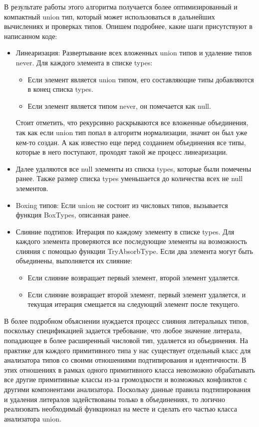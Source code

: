В результате работы этого алгоритма получается более оптимизированный и компактный union тип, который может
использоваться в дальнейших вычислениях и проверках типов.
Опишем подробнее, какие шаги присутствуют в написанном коде:

\begin{itemize}[left=2em]
    \item Линеаризация: Развертывание всех вложенных union типов и удаление типов never.
    Для каждого элемента в списке types:
    \begin{itemize}[left=2em]
        \item Если элемент является union типом, его составляющие типы добавляются в конец списка types.
        \item Если элемент является типом never, он помечается как null.
    \end{itemize}
    Стоит отметить, что рекурсивно раскрываются все вложенные объединения, так как если union тип попал в алгоритм
    нормализации, значит он был уже кем-то создан.
    А как известно еще перед созданием объединения все типы, которые в него поступают, проходят такой же процесс линеаризации.

    \item Далее удаляются все null элементы из списка types, которые были помечены ранее.
    Также размер списка types уменьшается до количества всех не null элементов.
    \item Boxing типов: Если union не состоит из числовых типов, вызывается функция BoxTypes, описанная ранее.
    \item Слияние подтипов: Итерация по каждому элементу в списке types.
    Для каждого элемента проверяются все последующие элементы на возможность слияния с помощью функции TryAbsorbType.
    Если два элемента могут быть объединены, выполняется их слияние:
    \begin{itemize}[left=2em]
        \item Если слияние возвращает первый элемент, второй элемент удаляется.
        \item Если слияние возвращает второй элемент, первый элемент удаляется, и текущая итерация смещается на
        следующий элемент после текущего.
    \end{itemize}
\end{itemize}

В более подробном объяснении нуждается процесс слияния литеральных типов, поскольку спецификацией задается требование,
что любое значение литерала, попадающее в более расширенный числовой тип, удаляется из объединения.
На практике для каждого примитивного типа у нас существует отдельный класс для анализатора типов со своими отношениями
подтипирования и идентичности.
В этих отношениях в рамках одного примитивного класса невозможно обрабатывать все другие примитивные классы из-за
громоздкости и возможных конфликтов с другими компонентами анализатора.
Поскольку данные правила подтипирования и удаления литералов задействованы только в объединениях, то логично реализовать
необходимый функционал на месте и сделать его частью класса анализатора union.

